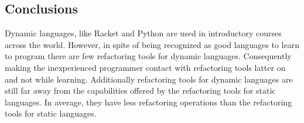 



\subsection{Conclusions}







Dynamic languages, like Racket and Python are used in introductory courses across the world.
However, in spite of being recognized as good languages to learn to program there are few refactoring tools for dynamic languages. 
Consequently making the inexperienced programmer contact with refactoring tools latter on and not while learning.
Additionally refactoring tools for dynamic languages are still far away from the capabilities offered by the refactoring tools for static languages. 
In average, they have less refactoring operations than the refactoring tools for static languages.

